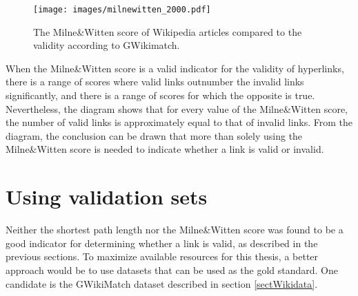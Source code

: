 \begin{figure}[h]
\centering
\captionsetup{justification=centering}
\texttt{[image: images/milnewitten\_2000.pdf]}
\caption{The Milne\&Witten score of Wikipedia articles compared to the validity according to GWikimatch.}
\label{imgMilneWitten2000}
\end{figure}

When the Milne\&Witten score is a valid indicator for the validity of hyperlinks, there is a range of scores where valid links outnumber the invalid links significantly, and there is a range of scores for which the opposite is true. Nevertheless, the diagram shows that for every value of the Milne\&Witten score, the number of valid links is approximately equal to that of invalid links. From the diagram, the conclusion can be drawn that more than solely using the Milne\&Witten score is needed to indicate whether a link is valid or invalid. 

\section{Using validation sets}
\label{secUsingValidationSets}
Neither the shortest path length nor the Milne\&Witten score was found to be a good indicator for determining whether a link is valid, as described in the previous sections. To maximize available resources for this thesis, a better approach would be to use datasets that can be used as the gold standard. One candidate is the GWikiMatch dataset described in section \ref{sectWikidata}.\\



